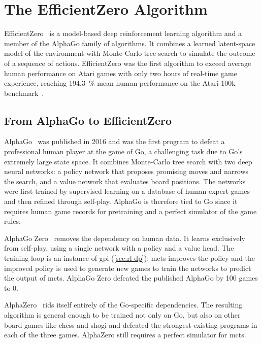 
\chapter{The EfficientZero Algorithm}\label{chap:efficientzero}

EfficientZero~\cite{ye_mastering_2021} is a model-based deep reinforcement
learning algorithm and a member of the AlphaGo family of algorithms.
It combines a learned latent-space model of the environment with Monte-Carlo
tree search to simulate the outcome of a sequence of actions.
EfficientZero was the first algorithm to exceed average human performance on
Atari games with only two hours of real-time game experience, reaching
\SI{194.3}{\percent} mean human performance on the Atari 100k
benchmark~\cite{ye_mastering_2021}.

\section{From AlphaGo to EfficientZero}\label{sec:ez-lineage}

AlphaGo~\cite{silver_mastering_2016} was published in 2016 and was the first program to defeat a
professional human player at the game of Go, a challenging task due to Go's extremely large state space.
It combines Monte-Carlo tree search with two deep neural networks: a policy
network that proposes promising moves and narrows the search, and a value
network that evaluates board positions.
The networks were first trained by supervised learning on a database of human
expert games and then refined through self-play.
AlphaGo is therefore tied to Go since it requires human game records for
pretraining and a perfect simulator of the game rules.

AlphaGo Zero~\cite{silver_mastering_2017-1} removes the dependency on human
data.
It learns exclusively from self-play, using a single network with a policy and a value head.
The training loop is an instance of \gls{gpi} (\cref{sec:rl-dp}): \gls{mcts} improves
the policy and the improved policy is used to generate new games to train the
networks to predict the output of \gls{mcts}.
AlphaGo Zero defeated the published AlphaGo by 100 games to 0.

AlphaZero~\cite{silver_general_2018} rids itself entirely of the Go-specific dependencies.
The resulting algorithm is general enough to be trained not only on Go, but
also on other board games like chess and shogi and defeated the strongest
existing programs in each of the three games.
AlphaZero still requires a perfect simulator for \gls{mcts}.

